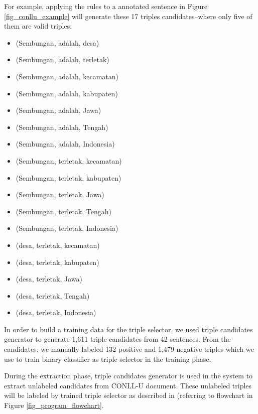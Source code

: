 \documentclass[conference,compsoc]{IEEEtran}
\begin{document}
For example, applying the rules to a annotated sentence in Figure \ref{fig_conllu_example} will generate these 17 triples candidates--where only five of them are valid triples:

\begin{itemize}
\item (Sembungan, adalah, desa) 
\item (Sembungan, adalah, terletak)
\item (Sembungan, adalah, kecamatan)
\item (Sembungan, adalah, kabupaten)
\item (Sembungan, adalah, Jawa)
\item (Sembungan, adalah, Tengah)
\item (Sembungan, adalah, Indonesia)
\item (Sembungan, terletak, kecamatan) 
\item (Sembungan, terletak, kabupaten) 
\item (Sembungan, terletak, Jawa) 
\item (Sembungan, terletak, Tengah)
\item (Sembungan, terletak, Indonesia) 
\item (desa, terletak, kecamatan)
\item (desa, terletak, kabupaten)
\item (desa, terletak, Jawa)
\item (desa, terletak, Tengah)
\item (desa, terletak, Indonesia)
\end{itemize}

In order to build a training data for the triple selector, we used triple candidates generator to generate 1,611 triple candidates from 42 sentences. From the candidates, we manually labeled 132 positive and 1,479 negative triples which we use to train binary classifier as triple selector in the training phase.

During the extraction phase, triple candidates generator is used in the system to extract unlabeled candidates from CONLL-U document. These unlabeled triples will be labeled by trained triple selector as described in  (referring to flowchart in Figure \ref{fig_program_flowchart}.
\end{document}
